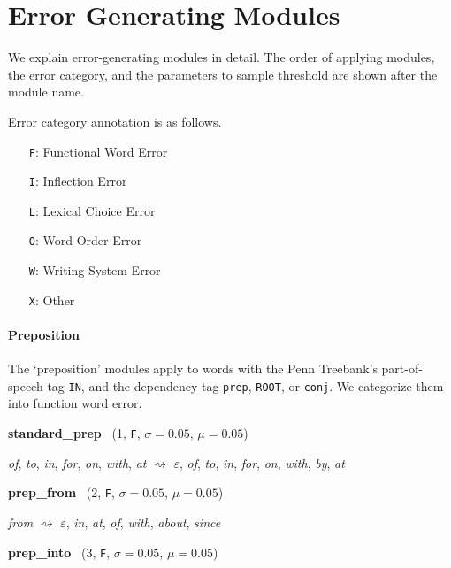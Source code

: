 \documentclass[11pt]{article}
\newenvironment{desc}{%
	\list{}{%
		\parsep 0.25em
		\topsep 0.25em
		\leftmargin 1em
		\rightmargin 0em
	}
	\item\relax
	\sloppy
}{%
	\endlist
}
\newcommand{\attr}[4]{%
	(#1, \texttt{#2}, $\sigma=#3$, $\mu=#4$)
}
\begin{document}
\appendix

\section{Error Generating Modules}

We explain error-generating modules in detail.
The order of applying modules, the error category, and the parameters to sample threshold are shown after the module name.

Error category annotation is as follows.
\begin{itemize}
	\item[\texttt{F}:] Functional Word Error
	\item[\texttt{I}:] Inflection Error
	\item[\texttt{L}:] Lexical Choice Error
	\item[\texttt{O}:] Word Order Error
	\item[\texttt{W}:] Writing System Error
	\item[\texttt{X}:] Other
\end{itemize}

\paragraph{Preposition}\mbox{}

The `preposition' modules apply to words with the Penn Treebank's part-of-speech tag \texttt{IN},
and the dependency tag \texttt{prep}, \texttt{ROOT}, or \texttt{conj}.
We categorize them into function word error.

\noindent
\textbf{standard\_prep}~\attr{1}{F}{0.05}{0.05}

\begin{desc}
	\textit{of},
	\textit{to},
	\textit{in},
	\textit{for},
	\textit{on},
	\textit{with},
	\textit{at}
	$\rightsquigarrow$
	\textit{$\varepsilon$},
	\textit{of},
	\textit{to},
	\textit{in},
	\textit{for},
	\textit{on},
	\textit{with},
	\textit{by},
	\textit{at}
\end{desc}

\noindent
\textbf{prep\_from}~\attr{2}{F}{0.05}{0.05}

\begin{desc}
	\textit{from}
	$\rightsquigarrow$
	\textit{$\varepsilon$},
	\textit{in},
	\textit{at},
	\textit{of},
	\textit{with},
	\textit{about},
	\textit{since}
\end{desc}

\noindent
\textbf{prep\_into}~\attr{3}{F}{0.05}{0.05}
\end{document}
